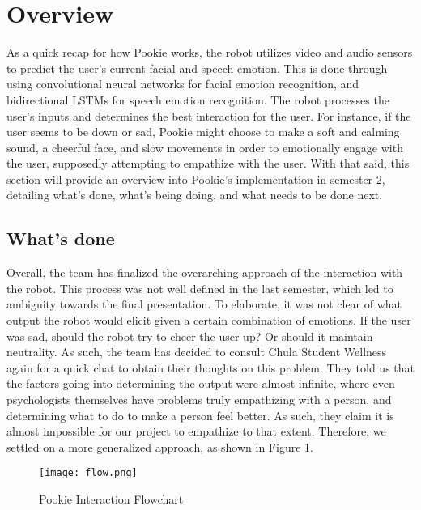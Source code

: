 \section{Overview}
As a quick recap for how Pookie works, the robot utilizes video and audio sensors to predict the user’s current facial and speech emotion. This is done through using convolutional neural networks for facial emotion recognition, and bidirectional LSTMs for speech emotion recognition. The robot processes the user’s inputs and determines the best interaction for the user. For instance, if the user seems to be down or sad, Pookie might choose to make a soft and calming sound, a cheerful face, and slow movements in order to emotionally engage with the user, supposedly attempting to empathize with the user. With that said, this section will provide an overview into Pookie’s implementation in semester 2, detailing what’s done, what’s being doing, and what needs to be done next.
\subsection{What’s done}
Overall, the team has finalized the overarching approach of the interaction with the robot. This process was not well defined in the last semester, which led to ambiguity towards the final presentation. To elaborate, it was not clear of what output the robot would elicit given a certain combination of emotions. If the user was sad, should the robot try to cheer the user up? Or should it maintain neutrality. As such, the team has decided to consult Chula Student Wellness again for a quick chat to obtain their thoughts on this problem. They told us that the factors going into determining the output were almost infinite, where even psychologists themselves have problems truly empathizing with a person, and determining what to do to make a person feel better. As such, they claim it is almost impossible for our project to empathize to that extent. Therefore, we settled on a more generalized approach, as shown in Figure \ref{fig:flow}.

\begin{figure}[ht]
    \centering
    \texttt{[image: flow.png]}
    \caption{Pookie Interaction Flowchart}
    \label{fig:flow}
\end{figure}

